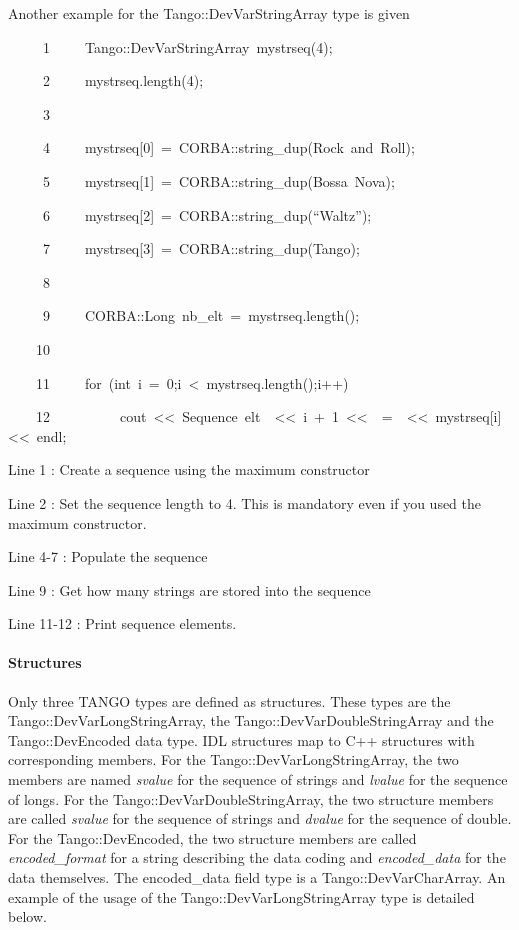 Another example for the Tango::DevVarStringArray
type is given


\begin{lyxcode}
~~~~~1~~~~~Tango::DevVarStringArray~mystrseq(4);

~~~~~2~~~~~mystrseq.length(4);

~~~~~3~~

~~~~~4~~~~~mystrseq{[}0{]}~=~CORBA::string\_dup(\textquotedbl{}Rock~and~Roll\textquotedbl{});

~~~~~5~~~~~mystrseq{[}1{]}~=~CORBA::string\_dup(\textquotedbl{}Bossa~Nova\textquotedbl{});

~~~~~6~~~~~mystrseq{[}2{]}~=~CORBA::string\_dup(``Waltz'');

~~~~~7~~~~~mystrseq{[}3{]}~=~CORBA::string\_dup(\textquotedbl{}Tango\textquotedbl{});

~~~~~8~~

~~~~~9~~~~~CORBA::Long~nb\_elt~=~mystrseq.length();

~~~~10~~

~~~~11~~~~~for~(int~i~=~0;i~<~mystrseq.length();i++)

~~~~12~~~~~~~~~~cout~<\textcompwordmark{}<~\textquotedbl{}Sequence~elt~\textquotedbl{}~<\textcompwordmark{}<~i~+~1~<\textcompwordmark{}<~\textquotedbl{}~=~\textquotedbl{}~<\textcompwordmark{}<~mystrseq{[}i{]}~<\textcompwordmark{}<~endl;
\end{lyxcode}


Line 1 : Create a sequence using the maximum constructor

Line 2 : Set the sequence length to 4. This is mandatory even if you
used the maximum constructor.

Line 4-7 : Populate the sequence

Line 9 : Get how many strings are stored into the sequence

Line 11-12 : Print sequence elements.


\paragraph{Structures}

Only three TANGO types are defined as structures. These types are
the Tango::DevVarLongStringArray,
the Tango::DevVarDoubleStringArray
and the Tango::DevEncoded data type. IDL
structures map to C++ structures with corresponding members. For the
Tango::DevVarLongStringArray, the two members are named \emph{svalue}
for the sequence of strings and \emph{lvalue} for the
sequence of longs. For the Tango::DevVarDoubleStringArray, the two
structure members are called \emph{svalue} for the sequence of strings
and \emph{dvalue} for the sequence of double. For the
Tango::DevEncoded, the two structure members are called \emph{encoded\_format}
for a string describing the data coding and \emph{encoded\_data}
for the data themselves. The encoded\_data field type is a Tango::DevVarCharArray.
An example of the usage of the Tango::DevVarLongStringArray type is
detailed below.

